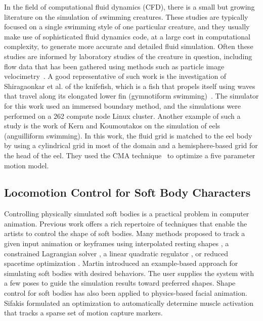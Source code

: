 In the field of computational fluid dynamics (CFD), there is a small but
growing literature on the simulation of swimming creatures.  These studies
are typically focused on a single swimming style of one particular creature,
and they usually make use of sophisticated fluid dynamics code, at a large cost in
computational complexity, to generate more accurate and detailed fluid simulation. Often these studies are informed by laboratory
studies of the creature in question, including flow data that has been
gathered using methods such as particle image
velocimetry~\cite{grant1997particle}.  A good representative of such work is
the investigation of Shiragaonkar et al. of the knifefish, which is a fish
that propels itself using waves that travel along its elongated lower fin
(gymnotiform swimming)~\cite{shirgaonkar2008hydrodynamics}.  The simulator
for this work used an immersed boundary method, and the simulations were
performed on a 262 compute node Linux cluster.  Another example of such a
study is the work of Kern and Koumoutakos \cite{kern2006simulations} on the simulation of eels
(anguilliform swimming).  In this work, the fluid
grid is matched to the eel body by using a cylindrical grid in most of the
domain and a hemisphere-based grid for the head of the eel.  They used the
CMA technique~\cite{hansen2004evaluating} to optimize a five parameter
motion model.

\subsection{Locomotion Control for Soft Body Characters}

Controlling physically simulated soft bodies is a practical problem in
computer animation. Previous work offers a rich repertoire of
techniques that enable the artists to control the shape of soft
bodies. Many methods proposed to track a given input animation or
keyframes using interpolated resting shapes \cite{Kondo:2005}, a
constrained Lagrangian solver \cite{Bergou:2007}, a linear quadratic
regulator \cite{Barbic:2008}, or reduced spacetime optimization
\cite{Barbic:2009}. Martin \etal \cite{Martin:2011} introduced an
example-based approach for simulating soft bodies with desired
behaviors. The user supplies the system with a few poses to guide the
simulation results toward preferred shapes. Shape control for soft
bodies has also been applied to physics-based facial
animation. Sifakis \cite{Sifakis:2005} formulated an optimization
to automatically determine muscle activation that tracks a sparse set
of motion capture markers.

